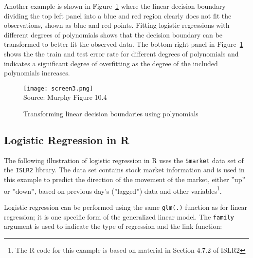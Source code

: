 Another example is shown in Figure~\ref{fig:nonlinearboundary2} where the linear decision boundary dividing the top left panel into a blue and red region clearly does not fit the observations, shown as blue and red points. Fitting logistic regressions with different degrees of polynomials shows that the decision boundary can be transformed to better fit the observed data. The bottom right panel in Figure~\ref{fig:nonlinearboundary2} shows the the train and test error rate for different degrees of polynomials and indicates a significant degree of overfitting as the degree of the included polynomials increases.

\begin{figure}
\centering
\texttt{[image: screen3.png]} \\
\scriptsize Source: Murphy Figure 10.4
\caption{Transforming linear decision boundaries using polynomials}
\label{fig:nonlinearboundary2}
\end{figure}

\subsection{Logistic Regression in R}

The following illustration of logistic regression in R uses the \texttt{Smarket} data set of the \texttt{ISLR2} library. The data set contains stock market information and is used in this example to predict the direction of the movement of the market, either ''up'' or ''down'', based on previous day's (''lagged'') data and other variables\footnote{The R code for this example is based on material in Section 4.7.2 of ISLR2}. 

Logistic regression can be performed using the same \texttt{glm(.)} function as for linear regression; it is one specific form of the generalized linear model. The \texttt{family} argument is used to indicate the type of regression and the link function:

\begin{samepage}
\end{samepage}

